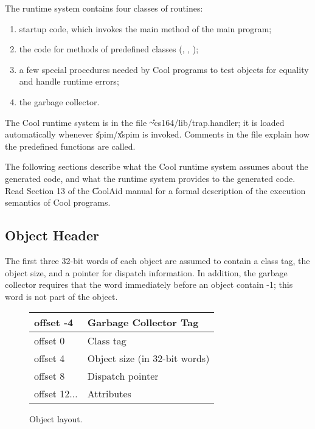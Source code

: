 The runtime system contains four classes of routines: 
\begin{enumerate}
\item startup code, which invokes the main method of the
main program;

\item the code for methods of predefined classes
(, , );

\item a few special procedures needed by Cool programs to test objects
	for equality and handle runtime errors;

\item the garbage collector.
\end{enumerate}

The Cool runtime system is in the file \U{\~{}cs164/lib/trap.handler};
it is loaded automatically whenever \U{spim}/\U{xspim} is invoked. 
Comments in the file explain how the predefined functions are called.

The following sections describe what the Cool runtime system assumes about
the generated code, and what the runtime system provides to the generated
code. Read Section 13 of the \U{CoolAid} manual for a formal description
of the execution semantics of Cool programs.

\subsection{Object Header}
The first three 32-bit words of each object are assumed to contain a
class tag, the object size, and a pointer for dispatch information.
In addition, the garbage collector requires that 
the word immediately before an object contain -1; this word is not part of the
object.

\begin{figure}
\begin{center}
\begin{tabular}{|l|l|}
\hline
offset -4 & Garbage Collector Tag\\
\hline
offset 0 & Class tag\\
\hline
offset 4 & Object size (in 32-bit words)\\
\hline
offset 8 & Dispatch pointer\\
\hline
offset 12$\ldots$ & Attributes \\
\hline
\end{tabular}
\end{center}
\caption{Object layout.}
\label{fig0}
\end{figure}

